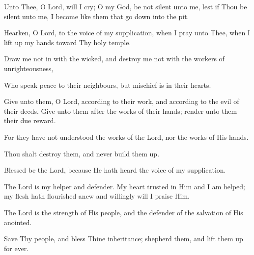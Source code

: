 Unto Thee, O Lord, will I cry; O my God, be not silent unto me, lest if Thou be silent unto me, I become like them that go down into the pit.

Hearken, O Lord, to the voice of my supplication, when I pray unto Thee, when I lift up my hands toward Thy holy temple.

Draw me not in with the wicked, and destroy me not with the workers of unrighteousness,

Who speak peace to their neighbours, but mischief is in their hearts.

Give unto them, O Lord, according to their work, and according to the evil of their deeds. Give unto them after the works of their hands; render unto them their due reward.

For they have not understood the works of the Lord, nor the works of His hands.

Thou shalt destroy them, and never build them up.

Blessed be the Lord, because He hath heard the voice of my supplication.

The Lord is my helper and defender. My heart trusted in Him and I am helped; my flesh hath flourished anew and willingly will I praise Him.

The Lord is the strength of His people, and the defender of the salvation of His anointed.

Save Thy people, and bless Thine inheritance; shepherd them, and lift them up for ever.
